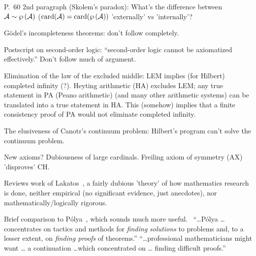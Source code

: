 P.~$60$ $2$nd paragraph (Skolem's paradox):
\hfill\break
What's the difference between $\mathcal{A} \sim  \wp \left( \mathcal{A} \right) $ 
($\mathrm{card}(\mathcal{A})=\mathrm{card}(\mathcal{ \wp \left( \mathcal{A} \right) })$
 'externally' vs 'internally'?

\textsf{G\"{o}del's incompleteness theorems:}
don't follow completely.

\textsf{Postscript on second-order logic:}
``second-order logic cannot be axiomatized effectively.''
Don't follow much of argument.

\textsf{Elimination of the law of the excluded middle:}
\hfill\break
LEM implies (for Hilbert) completed infinity (?).
\hfill\break
Heyting arithmetic (HA) excludes LEM;
any true statement in PA (Peano arithmetic) 
(and many other arithmetic systems)
can be translated into
a true statement in HA.
\hfill\break
This (somehow) implies that a finite consistency proof
of PA would not eliminate completed infinity.

\textsf{The elusiveness of Canotr's continuum problem:}
\hfill\break
Hilbert's program can't solve the continuum problem.


\textsf{New axioms?}
\hfill\break
Dubiousness of large cardinals.
\hfill\break
Freiling axiom of 
symmetry (AX)~\cite{freiling1986,wiki:Freilings_axiom_of_symmetry}
'disproves' CH.

\label{sec:logic_of_mathematical_discovery}

\cite[ch.~3 ``The logic of mathematical discovery versus
the logical structure of mathematics'']{Feferman1998LightOfLogic}

Reviews work of Lakatos~\cite{Lakatos1976proofs,Lakatos1978MSE},
a fairly dubious 'theory' of how mathematics research is done,
neither empirical (no significant evidence, just anecdotes),
nor mathematically/logically rigorous.

Brief comparison to 
P\'{o}lya~\cite[ch~3,sec~7]{Feferman1998LightOfLogic},
which sounds much more useful.~\cite{PolyaSolveIt1957,
PolyaMathDiscovery1965,Polya1MathPlausibleReasoning1968}
``\ldots P\'{o}lya \ldots concentrates on tactics and methods
for \textit{finding solutions} to problems and, 
to a lesser extent,
on \textit{finding proofs} of theorems.''
\hfill\break
``\ldots professional mathematicians might want \ldots
a continuation \ldots which concentrated on \ldots
finding difficult proofs.''

